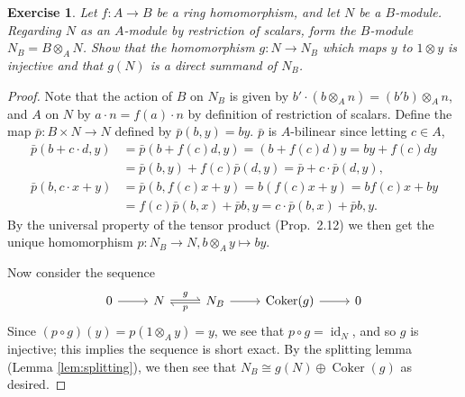 \documentclass[12pt,letterpaper]{article}
\newtheorem{problem}{Exercise}[section]
\theoremstyle{definition}
\theoremstyle{remark}
\numberwithin{figure}{problem}
\numberwithin{equation}{section}
\DeclareMathOperator{\Coker}{Coker}
\DeclareMathOperator{\id}{id}
\begin{document}
\begin{problem}
  Let
  $f\colon A \to
  B$ be a ring homomorphism, and let
  $N$ be a
  $B$-module.
  Regarding
  $N$ as an
  $A$-module by restriction of scalars, form the
  $B$-module
  $N_B = B \otimes_A
  N$.
  Show that the homomorphism
  $g\colon N \to
  N_B$ which maps
  $y$ to
  $1 \otimes
  y$ is injective and that
  $g(N)$ is a direct summand of
  $N_B$.
\end{problem}
\begin{proof}
  Note that the action of
  $B$ on
  $N_B$ is given by
  $b' \cdot (b \otimes_A n) = (b'b) \otimes_A
  n$, and
  $A$ on
  $N$ by
  $a \cdot n = f(a) \cdot
  n$ by definition of restriction of scalars.
  Define the map
  $\bar{p}\colon B \times N \to
  N$ defined by
  $\bar{p}(b,y) =
  by$.
  $\bar{p}$ is
  $A$-bilinear since letting
  $c \in
  A$,
  \begin{align*}
    \bar{p}(b+c \cdot d,y) &%
    = \bar{p}(b+f(c)d,y) = (b + f(c)d)y = by + f(c)dy\\
    &%
    = \bar{p}(b,y) + f(c)\bar{p}(d,y) = \bar{p} + c \cdot \bar{p}(d,y),\\
    \bar{p}(b,c \cdot x+y) &%
    = \bar{p}(b,f(c)x + y) = b(f(c)x+y) = bf(c)x + by\\
    &%
    = f(c)\bar{p}(b,x) + \bar{p}{b,y} = c \cdot \bar{p}(b,x) + \bar{p}{b,y}.
  \end{align*}
  By the universal property of the tensor product (Prop.~2.12) we then get the unique homomorphism
  $p\colon N_B \to N, b\otimes_A y \mapsto
  by$.
  \par Now consider the sequence
  \begin{equation*}
    \begin{tikzcd}
      0 \rar & N \rar[rightharpoonup,yshift=0.25ex]{g} &
      \lar[rightharpoonup,yshift=-0.25ex]{p} N_B \rar &
      \Coker(g) \rar &
      0
    \end{tikzcd}
  \end{equation*}
  Since
  $(p \circ g)(y) = p(1 \otimes_A y) =
  y$, we see that
  $p \circ g =
  \id_N$, and so
  $g$ is injective; this implies the sequence is short exact.
  By the splitting lemma (Lemma \ref{lem:splitting}), we then see that
  $N_B \cong g(N) \oplus
  \Coker(g)$ as desired.
\end{proof}
\end{document}

